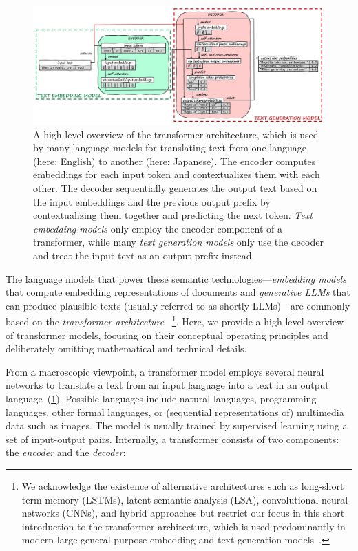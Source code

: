 \begin{figure}[Z]
	\centering
	\includegraphics[width=\linewidth]{04_semtec/transformer.png}
	\caption[A high-level overview of the \emph{transformer architecture} for large language models that embed and generate text.]{
		A high-level overview of the transformer architecture, which is used by many language models for translating text from one language (here: English) to another (here: Japanese).
		The encoder computes embeddings for each input token and contextualizes them with each other.
		The decoder sequentially generates the output text based on the input embeddings and the previous output prefix by contextualizing them together and predicting the next token.
		\emph{Text embedding models} only employ the encoder component of a transformer, while many \emph{text generation models} only use the decoder and treat the input text as an output prefix instead.
	}
	\label{fig:background/semtec/transformer}
\end{figure}

The language models that power these semantic technologies---\emph{embedding models} that compute embedding representations of documents and \emph{generative LLMs} that can produce plausible texts (usually referred to as shortly LLMs)---are commonly based on the \emph{transformer architecture}~\cite{vaswani2017attention}%
\footnote{
	We acknowledge the existence of alternative architectures such as long-short term memory (LSTMs), latent semantic analysis (LSA), convolutional neural networks (CNNs), and hybrid approaches but restrict our focus in this short introduction to the transformer architecture, which is used predominantly in modern large general-purpose embedding and text generation models~\cite{oralkbekova2023contemporary}.
}.
Here, we provide a high-level overview of transformer models, focusing on their conceptual operating principles and deliberately omitting mathematical and technical details.

From a macroscopic viewpoint, a transformer model employs several neural networks to translate a text from an input language into a text in an output language~(\cref{fig:background/semtec/transformer}).
Possible languages include natural languages, programming languages, other formal languages, or (sequential representations of) multimedia data such as images.
The model is usually trained by supervised learning using a set of input-output pairs.
Internally, a transformer consists of two components: the \emph{encoder} and the \emph{decoder}:

